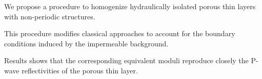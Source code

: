 \documentclass[draft]{agujournal2019}
\begin{document}




\begin{keypoints}
\item We propose a procedure to homogenize hydraulically isolated porous thin layers with non-periodic structures.
\item This procedure modifies classical approaches to account for the boundary conditions induced by the impermeable background.
\item Results shows that the corresponding equivalent moduli reproduce closely the P-wave reflectivities of the porous thin layer.


\end{keypoints}

%
%

%
%
\end{document}
